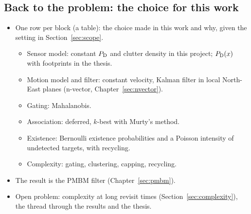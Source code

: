 \subsection{Back to the problem: the choice for this work}
\label{sec:mtt-choice}
\begin{itemize}
    \item One row per block (a table): the choice made in this work and why, given the setting in Section~\ref{sec:scope}.
    \begin{itemize}
        \item Sensor model: constant $P_{\mathrm{D}}$ and clutter density in this project; $P_{\mathrm{D}}(x)$ with footprints in the thesis.
        \item Motion model and filter: constant velocity, Kalman filter in local North-East planes (n-vector, Chapter~\ref{sec:nvector}).
        \item Gating: Mahalanobis.
        \item Association: deferred, $k$-best with Murty's method.
        \item Existence: Bernoulli existence probabilities and a Poisson intensity of undetected targets, with recycling.
        \item Complexity: gating, clustering, capping, recycling.
    \end{itemize}
    \item The result is the PMBM filter (Chapter~\ref{sec:pmbm}).
    \item Open problem: complexity at long revisit times (Section~\ref{sec:complexity}), the thread through the results and the thesis.
\end{itemize}
